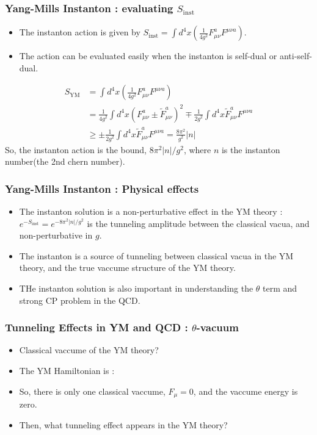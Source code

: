 \documentclass[10pt]{beamer}
\begin{document}
\begin{frame}
        \frametitle{Yang-Mills Instanton : evaluating $S_{\text{inst}}$}
        \begin{itemize}
        \item The instanton action is given by $S_{\text{inst}} = \int d^4x \left(\frac{1}{4g^2}F_{\mu\nu}^a F^{\mu\nu a}\right)$.
        \item The action can be evaluated easily when the instanton is self-dual or anti-self-dual.
        \end{itemize}
        \begin{align*}
        S_{\text{YM}} &= \int d^4x \left(\frac{1}{4g^2}F_{\mu\nu}^a F^{\mu\nu a}\right) \\
        &=  \frac{1}{4g^2} \int d^4x \left(F_{\mu\nu}^a \pm \tilde{F}_{\mu\nu}^a\right)^2 \mp \frac{1}{2g^2} \int d^4x \tilde{F}_{\mu\nu}^a F^{\mu\nu a} \\ 
        &\geq \pm \frac{1}{2g^2} \int d^4x \tilde{F}_{\mu\nu}^a F^{\mu\nu a} = \frac{8\pi^2}{g^2}|n|
        \end{align*}
        So, the instanton action is the bound, $8\pi^2|n|/g^2$, where $n$ is the instanton number(the 2nd chern number).
        
        \end{frame}

\begin{frame}
\frametitle{Yang-Mills Instanton : Physical effects}
\begin{itemize}
\item The instanton solution is a non-perturbative effect in the YM theory : $e^{-S_{\text{inst}}}=e^{-8\pi^2|n|/g^2}$ is the tunneling amplitude between the classical vacua, and non-perturbative in $g$.
\item The instanton is a source of tunneling between classical vacua in the YM theory, and the true vaccume structure of the YM theory.
\item THe instanton solution is also important in understanding the $\theta$ term and strong CP problem in the QCD.
\end{itemize}
\end{frame}
\begin{frame}
    \frametitle{Tunneling Effects in YM and QCD : $\theta$-vacuum}
    \begin{itemize}
    \item Classical vaccume of the YM theory?
    \item The YM Hamiltonian is : 
    \item So, there is only one classical vaccume, $F_\mu = 0$, and the vaccume energy is zero.
    \item Then, what tunneling effect appears in the YM theory?
    \end{itemize}
    \end{frame}
\end{document}
